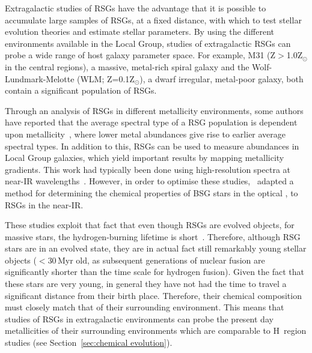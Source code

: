
Extragalactic studies of RSGs have the advantage that it is possible to accumulate large samples of RSGs, at a fixed distance, with which to test stellar evolution theories and estimate stellar parameters.
By using the different environments available in the Local Group, studies of extragalactic RSGs can probe a wide range of host galaxy parameter space.
For example, M31 (Z$>$1.0Z$_{\odot}$ in the central regions), a massive, metal-rich spiral galaxy and the Wolf-Lundmark-Melotte (WLM; Z=0.1Z$_{\odot}$), a dwarf irregular, metal-poor galaxy, both contain a significant population of RSGs.

Through an analysis of RSGs in different metallicity environments, some authors have reported that the average spectral type of a RSG population is dependent upon metallicity~\citep{Elias85, MasseyOlsen03, 2012AJ....144....2L}, where lower metal abundances give rise to earlier average spectral types.
In addition to this, RSGs can be used to measure abundances in Local Group galaxies, which yield important results by mapping metallicity gradients.
This work had typically been done using high-resolution spectra at near-IR wavelengths~\citep{Cunha07, Davies09a,Davies09b}.
However, in order to optimise these studies,~\cite{2010MNRAS.407.1203D} adapted a method for determining the chemical properties of BSG stars in the optical
\citep{2008ApJ...681..269K,2010AN....331..459K}, to RSGs in the near-IR.

These studies exploit that fact that even though RSGs are evolved objects, for massive stars, the hydrogen-burning lifetime is short~\citep[just over 25\,Myr for a 8\,M$_{\odot}$ star and consequently shorter for higher-mass stars][]{2012A&A...537A.146E}.
Therefore, although RSG stars are in an evolved state, they are in actual fact still remarkably young stellar objects ($<$30\,Myr old, as subsequent generations of nuclear fusion are significantly shorter than the time scale for hydrogen fusion).
Given the fact that these stars are very young, in general they have not had the time to travel a significant distance from their birth place.
Therefore, their chemical composition must closely match that of their surrounding environment.
This means that studies of RSGs in extragalactic environments can probe the present day metallicities of their surrounding environments which are comparable to H\,\2 region studies (see Section~\ref{sec:chemical evolution}).

